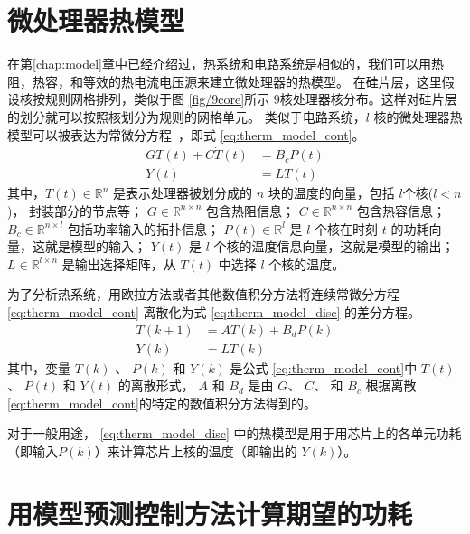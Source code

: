  
 \section{微处理器热模型}\label{sec:therm_model}
在第\ref{chap:model}章中已经介绍过，热系统和电路系统是相似的，我们可以用热阻，热容，和等效的热电流电压源来建立微处理器的热模型。
在硅片层，这里假设核按规则网格排列，类似于图 \ref{fig/9core}所示 $9$核处理器核分布。这样对硅片层的划分就可以按照核划分为规则的网格单元。
类似于电路系统，$l$ 核的微处理器热模型可以被表达为常微分方程~，即式 \eqref{eq:therm_model_cont}。
\begin{equation}\label{eq:therm_model_cont} 
\begin{split}
G T(t) + C \dot{T}(t) &= B_c P(t)\\
Y(t) &= L T(t)
\end{split}
\end{equation}
其中，$T(t) \in \mathbb{R}^n$ 是表示处理器被划分成的 $n$ 块的温度的向量，包括 $l$个核($l < n$)， 封装部分的节点等；
$G \in \mathbb{R}^{n\times n}$ 包含热阻信息； 
$C \in \mathbb{R}^{n \times n}$ 包含热容信息；
$B_c \in \mathbb{R}^{n \times l}$ 包括功率输入的拓扑信息；
$P(t) \in \mathbb{R}^{l}$ 是 $l$ 个核在时刻 $t$ 的功耗向量，这就是模型的输入；
$Y(t)$ 是 $l$ 个核的温度信息向量，这就是模型的输出；
$L \in \mathbb{R}^{l \times n}$ 是输出选择矩阵，从 $T(t)$ 中选择 $l$ 个核的温度。

为了分析热系统，用欧拉方法或者其他数值积分方法将连续常微分方程 \eqref{eq:therm_model_cont} 离散化为式 \eqref{eq:therm_model_disc} 的差分方程。
\begin{equation}\label{eq:therm_model_disc}
\begin{split}
T(k+1) &= A T(k)+B_d P(k)\\
Y(k) &= L T(k)
\end{split}
\end{equation}
其中，变量 $T(k)$ 、 $P(k)$ 和 $Y(k)$ 是公式 \eqref{eq:therm_model_cont}中
$T(t)$ 、 $P(t)$ 和 $Y(t)$ 的离散形式，  $A$ 和
$B_d$ 是由 $G$、 $C$、 和 $B_c$ 根据离散\eqref{eq:therm_model_cont}的特定的数值积分方法得到的。

对于一般用途， \eqref{eq:therm_model_disc} 中的热模型是用于用芯片上的各单元功耗（即输入$P(k)$）来计算芯片上核的温度（即输出的 $Y(k)$）。

\section{用模型预测控制方法计算期望的功耗}\label{sec:mpc}

